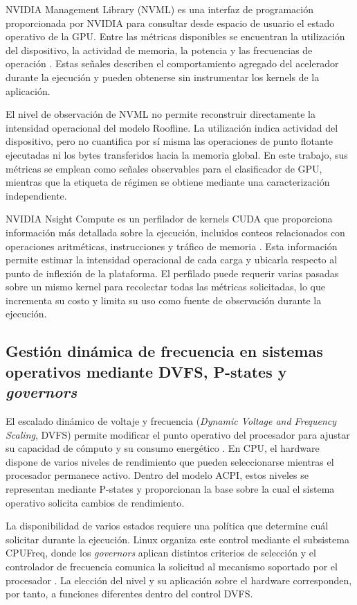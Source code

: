 NVIDIA Management Library (NVML) es una interfaz de programación proporcionada
por NVIDIA para consultar desde espacio de usuario el estado operativo de la
GPU. Entre las métricas disponibles se encuentran la utilización del
dispositivo, la actividad de memoria, la potencia y las frecuencias de
operación \cite{NVML2026}. Estas señales describen el comportamiento agregado
del acelerador durante la ejecución y pueden obtenerse sin instrumentar los
kernels de la aplicación.

El nivel de observación de NVML no permite reconstruir directamente la
intensidad operacional del modelo Roofline. La utilización indica actividad
del dispositivo, pero no cuantifica por sí misma las operaciones de punto
flotante ejecutadas ni los bytes transferidos hacia la memoria global. En este
trabajo, sus métricas se emplean como señales observables para el clasificador
de GPU, mientras que la etiqueta de régimen se obtiene mediante una
caracterización independiente.

NVIDIA Nsight Compute es un perfilador de kernels CUDA que proporciona
información más detallada sobre la ejecución, incluidos conteos relacionados
con operaciones aritméticas, instrucciones y tráfico de memoria
\cite{Nsight2026}. Esta información permite estimar la intensidad operacional
de cada carga y ubicarla respecto al punto de inflexión de la plataforma. El
perfilado puede requerir varias pasadas sobre un mismo kernel para recolectar
todas las métricas solicitadas, lo que incrementa su costo y limita su uso como
fuente de observación durante la ejecución.


\subsection{Gestión dinámica de frecuencia en sistemas operativos
mediante DVFS, P-states y \textit{governors}}
\label{sec:dvfs-cpu}

El escalado dinámico de voltaje y frecuencia
(\textit{Dynamic Voltage and Frequency Scaling}, DVFS) permite modificar el
punto operativo del procesador para ajustar su capacidad de cómputo y su
consumo energético \cite{Hebbar2022}. En CPU, el hardware dispone de varios
niveles de rendimiento que pueden seleccionarse mientras el procesador
permanece activo. Dentro del modelo ACPI, estos niveles se representan mediante
P-states y proporcionan la base sobre la cual el sistema operativo solicita
cambios de rendimiento.

La disponibilidad de varios estados requiere una política que determine cuál
solicitar durante la ejecución. Linux organiza este control mediante el
subsistema CPUFreq, donde los \textit{governors} aplican distintos criterios
de selección y el controlador de frecuencia comunica la solicitud al mecanismo
soportado por el procesador \cite{Hebbar2022,LinuxCPUFreq2026}. La elección del
nivel y su aplicación sobre el hardware corresponden, por tanto, a funciones
diferentes dentro del control DVFS.

